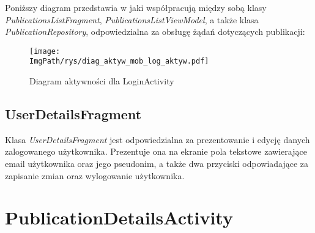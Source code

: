 \documentclass[a4paper,12pt,twoside,openany]{report}
\newcommand{\ImgPath}{.}
\begin{document}
Poniższy diagram przedstawia w jaki współpracują między sobą klasy \textit{PublicationsListFragment}, \textit{PublicationsListViewModel}, a także klasa \textit{PublicationRepository}, odpowiedzialna za obsługę żądań dotyczących publikacji:
\begin{figure}[!htbp]
	\begin{center}
		\centering
		\texttt{[image: \\ImgPath/rys/diag\_aktyw\_mob\_log\_aktyw.pdf]}
	\end{center}
	\caption{Diagram aktywności dla LoginActivity}
	\label{diagramAktywnosciLoginActivity}
\end{figure}

\subsection{UserDetailsFragment}
Klasa \textit{UserDetailsFragment} jest odpowiedzialna za prezentowanie i edycję danych zalogowanego użytkownika. Prezentuje ona na ekranie pola tekstowe zawierające email użytkownika oraz jego pseudonim, a także dwa przyciski odpowiadające za zapisanie zmian oraz wylogowanie użytkownika. 

\section{PublicationDetailsActivity}

\begin{thebibliography}{99}



\end{thebibliography}

\zakonczenie  %
\end{document}
